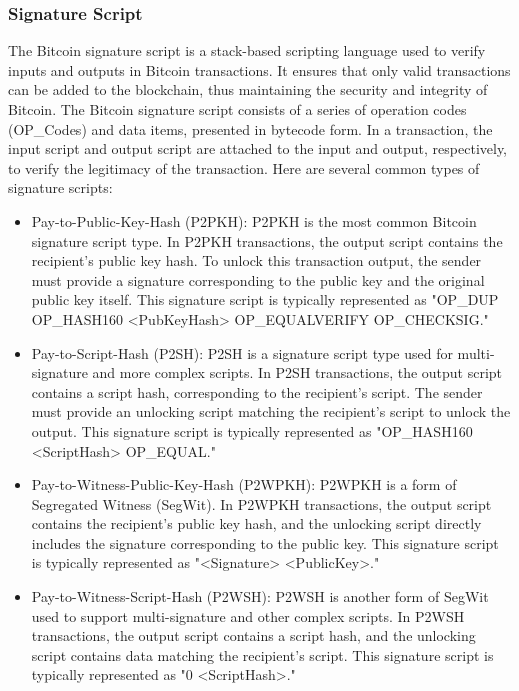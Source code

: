 \documentclass{article}
\begin{document}
\subsubsection{Signature Script}
The Bitcoin signature script is a stack-based scripting language used to verify inputs and outputs in Bitcoin transactions. It ensures that only valid transactions can be added to the blockchain, thus maintaining the security and integrity of Bitcoin. The Bitcoin signature script consists of a series of operation codes (OP\_Codes) and data items, presented in bytecode form. In a transaction, the input script and output script are attached to the input and output, respectively, to verify the legitimacy of the transaction.\cite{wikicontracts}
Here are several common types of signature scripts:
\begin{itemize}
    \item Pay-to-Public-Key-Hash (P2PKH): P2PKH is the most common Bitcoin signature script type. In P2PKH transactions, the output script contains the recipient's public key hash. To unlock this transaction output, the sender must provide a signature corresponding to the public key and the original public key itself. This signature script is typically represented as "OP\_DUP OP\_HASH160 <PubKeyHash> OP\_EQUALVERIFY OP\_CHECKSIG."
    \item Pay-to-Script-Hash (P2SH): P2SH is a signature script type used for multi-signature and more complex scripts. In P2SH transactions, the output script contains a script hash, corresponding to the recipient's script. The sender must provide an unlocking script matching the recipient's script to unlock the output. This signature script is typically represented as "OP\_HASH160 <ScriptHash> OP\_EQUAL."
    \item Pay-to-Witness-Public-Key-Hash (P2WPKH): P2WPKH is a form of Segregated Witness (SegWit). In P2WPKH transactions, the output script contains the recipient's public key hash, and the unlocking script directly includes the signature corresponding to the public key. This signature script is typically represented as "<Signature> <PublicKey>."
    \item Pay-to-Witness-Script-Hash (P2WSH): P2WSH is another form of SegWit used to support multi-signature and other complex scripts. In P2WSH transactions, the output script contains a script hash, and the unlocking script contains data matching the recipient's script. This signature script is typically represented as "0 <ScriptHash>."
\end{itemize}
\end{document}
